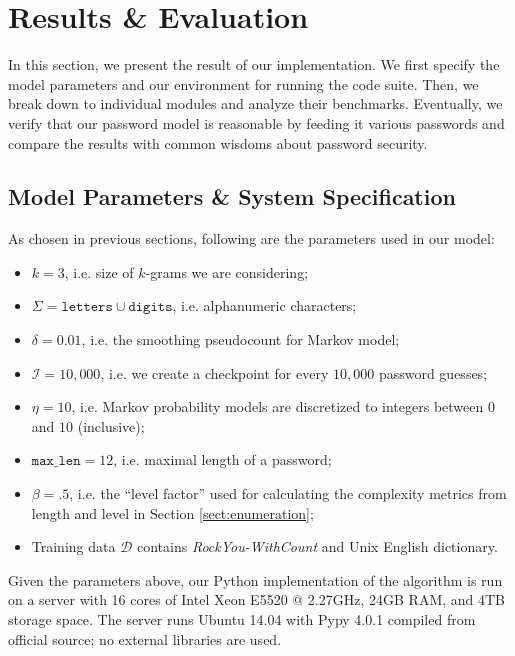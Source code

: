 \documentclass{article} %
\theoremstyle{definition}
\theoremstyle{theorem}
\theoremstyle{remark}
\theoremstyle{remark}
\begin{document}
\section{Results \& Evaluation} \label{sect:results}
\par\quad In this section, we present the result of our implementation. We first specify the model parameters and our environment for running the code suite. Then, we break down to individual modules and analyze their benchmarks. Eventually, we verify that our password model is reasonable by feeding it various passwords and compare the results with common wisdoms about password security.

\subsection{Model Parameters \& System Specification}
\par\quad As chosen in previous sections, following are the parameters used in our model:
\begin{itemize}
    \item $k=3$, i.e. size of $k$-grams we are considering;
    \item $\Sigma = \texttt{letters} \cup \texttt{digits}$, i.e. alphanumeric characters;
    \item $\delta = 0.01$, i.e. the smoothing pseudocount for Markov model;
    \item $\mathcal{I}=10,000$, i.e. we create a checkpoint for every $10,000$ password guesses;
    \item $\eta = 10$, i.e. Markov probability models are discretized to integers between $0$ and $10$ (inclusive);
    \item $\texttt{max\_len} = 12$, i.e. maximal length of a password;
    \item $\beta = .5$, i.e. the ``level factor'' used for calculating the complexity metrics from length and level in Section \ref{sect:enumeration};
    \item Training data $\mathcal{D}$ contains \emph{RockYou-WithCount} and Unix English dictionary.
\end{itemize}

\par\quad Given the parameters above, our Python implementation of the algorithm is run on a server with 16 cores of Intel Xeon E5520 @ 2.27GHz, 24GB RAM, and 4TB storage space. The server runs Ubuntu 14.04 with Pypy 4.0.1 compiled from official source; no external libraries are used.
\end{document}
